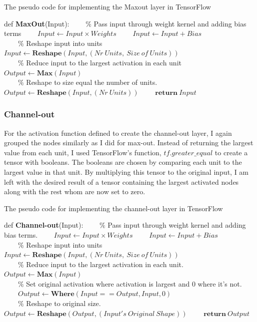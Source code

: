 \begin{algorithm}
    \caption{The pseudo code for implementing the Maxout layer in TensorFlow}\label{alg:maxout}
    \begin{algorithmic}[1]
    \State def \textbf{MaxOut}(Input): 
    \State \ \ \ \ $\%$ Pass input through weight kernel and adding bias terms
    \State \ \ \ \ $Input \gets Input \times Weights$
    \State \ \ \ \ $Input \gets Input + Bias$
    \\
    \State \ \ \ \ $\%$ Reshape input into units
    \State \ \ \ \ $Input \gets \textbf{Reshape}(Input,(Nr\ Units,\ Size \ of \ Units))$
    \\
    \State \ \ \ \ $\%$ Reduce input to the largest activation in each unit
    \State \ \ \ \ $Output \gets \textbf{Max}(Input)$
    \\
    \State \ \ \ \ $\%$ Reshape to size equal the number of units.
    \State \ \ \ \ $Output \gets \textbf{Reshape}(Input,(Nr \ Units))$
    \State \ \ \ \ $\textbf{return}\ Input$
    \end{algorithmic}
\end{algorithm}

\subsubsection*{Channel-out}
For the activation function defined to create the channel-out layer, I again grouped
the nodes similarly as I did for max-out. Instead of returning the largest value from each 
unit, I used TensorFlow's function, $tf.greater\_equal$ to create a tensor with booleans. The 
booleans are chosen by comparing each unit to the largest value in that unit. By multiplying 
this tensor to the original input, I am left with the desired result of a tensor containing 
the largest activated nodes along with the rest whom are now set to zero. 
\begin{algorithm}
    \caption{The pseudo code for implementing the channel-out layer in TensorFlow}\label{alg:channel-out}
    \begin{algorithmic}[1]
    \State def \textbf{Channel-out}(Input): 
    \State \ \ \ \ $\%$ Pass input through weight kernel and adding bias terms.
    \State \ \ \ \ $Input \gets Input \times Weights$
    \State \ \ \ \ $Input \gets Input + Bias$
    \\
    \State \ \ \ \ $\%$ Reshape input into units
    \State \ \ \ \ $Input \gets \textbf{Reshape}(Input,(Nr\ Units,\ Size \ of \ Units))$
    \\
    \State \ \ \ \ $\%$ Reduce input to the largest activation in each unit.
    \State \ \ \ \ $Output \gets \textbf{Max}(Input)$
    \\
    \State \ \ \ \ $\%$ Set original activation where activation is largest and 0 where it's not.
    \State \ \ \ \ $Output \gets \textbf{Where}(Input == Output, Input,0)$
    \\
    \State \ \ \ \ $\%$ Reshape to original size.
    \State \ \ \ \ $Output \gets \textbf{Reshape}(Output,(Input's \ Original \ Shape))$
    \State \ \ \ \ $\textbf{return}\ Output$
    \end{algorithmic}
\end{algorithm}
